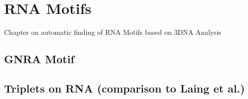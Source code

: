 \chapter{RNA Motifs}
\label{motifs} 

Chapter on automatic finding of RNA Motifs based on 3DNA Analysis
\section{GNRA Motif}
\section{Triplets on RNA (comparison to Laing et al.)}


